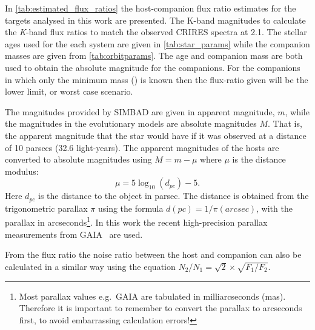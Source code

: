In \cref{tab:estimated_flux_ratios} the host-companion flux ratio estimates for the targets analysed in this work are presented.
The {K}-band magnitudes to calculate the \emph{K}-band flux ratios to match the observed {CRIRES} spectra at 2.1\um{}.
The stellar ages used for the each system are given in \cref{tab:star_params} while the companion masses are given from \cref{tab:orbitparams}.
The age and companion mass are both used to obtain the absolute magnitude for the companions.
For the companions in which only the minimum mass (\Mtwosini{}) is known then the flux-ratio given will be the lower limit, or worst case scenario.


The magnitudes provided by {SIMBAD} are given in apparent magnitude, \(m\), while the magnitudes in the evolutionary models are absolute magnitudes \(M\).
That is, the apparent magnitude that the star would have if it was observed at a distance of 10 parsecs (32.6 light-years).
The apparent magnitudes of the hosts are converted to absolute magnitudes using \(M = m - \mu\) where \(\mu\) is the distance modulus:
\begin{equation}
\mu = 5 \log_{10}(d_{pc}) -5.\label{eqn:distance_modulus}
\end{equation}
Here $d_{pc}$ is the distance to the object in parsec.
The distance is obtained from the trigonometric parallax  $\pi$ using the formula $d(pc) = 1 /\pi(arcsec)$, with the parallax in arcseconds\footnote{Most parallax values e.g.\ GAIA are tabulated in milliarcseconds (mas).
Therefore it is important to remember to convert the parallax to arcseconds first, to avoid embarrassing calculation errors!}.
In this work the recent high-precision parallax measurements from GAIA~\citep{collaboration_gaia_2018} are used.

From the flux ratio the noise ratio between the host and companion can also be calculated in a similar way using the equation \(N_{2}/N_{1} = \sqrt{2} \times\sqrt{F_{1}/F_{2}}\).


